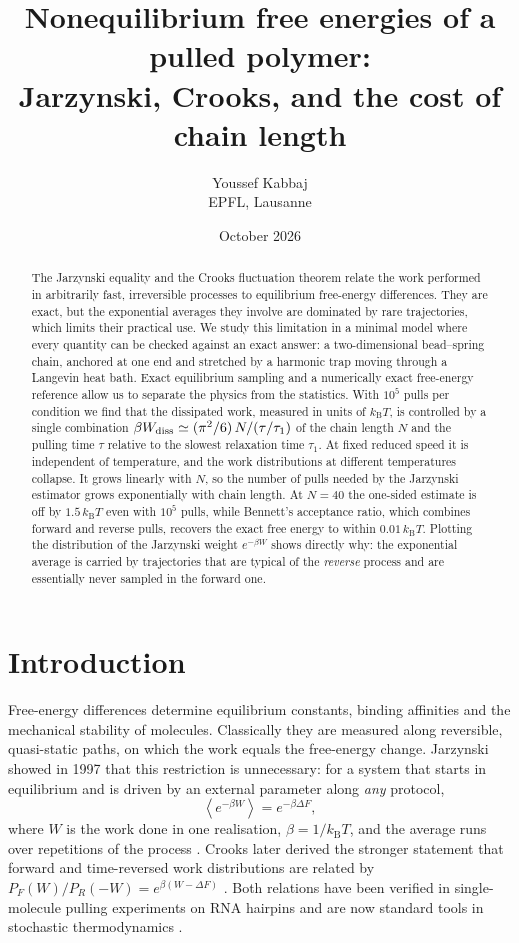 \documentclass[11pt,a4paper]{article}
\title{\textbf{Nonequilibrium free energies of a pulled polymer:\\
Jarzynski, Crooks, and the cost of chain length}}
\author{Youssef Kabbaj\\[0.2em]\small EPFL, Lausanne}
\date{October 2026}
\newcommand{\kT}{k_{\mathrm B}T}
\newcommand{\avg}[1]{\left\langle #1\right\rangle}
\newcommand{\Wd}{W_{\rm diss}}
\begin{document}
\maketitle

\begin{abstract}
The Jarzynski equality and the Crooks fluctuation theorem relate the work performed in arbitrarily
fast, irreversible processes to equilibrium free-energy differences. They are exact, but the
exponential averages they involve are dominated by rare trajectories, which limits their practical
use. We study this limitation in a minimal model where every quantity can be checked against an exact
answer: a two-dimensional bead--spring chain, anchored at one end and stretched by a harmonic trap
moving through a Langevin heat bath. Exact equilibrium sampling and a numerically exact free-energy
reference allow us to separate the physics from the statistics. With $10^5$ pulls per condition we find
that the dissipated work, measured in units of $\kT$, is controlled by a single combination
$\beta\Wd\simeq(\pi^2/6)\,N/(\tau/\tau_1)$ of the chain length $N$ and the pulling time $\tau$ relative to
the slowest relaxation time $\tau_1$. At fixed reduced speed it is independent of temperature, and the
work distributions at different temperatures collapse. It grows linearly with $N$, so the number of
pulls needed by the Jarzynski estimator grows exponentially with chain length. At $N=40$ the one-sided
estimate is off by $1.5\,\kT$ even with $10^5$ pulls, while Bennett's acceptance ratio, which combines
forward and reverse pulls, recovers the exact free energy to within $0.01\,\kT$. Plotting the
distribution of the Jarzynski weight $e^{-\beta W}$ shows directly why: the exponential average is
carried by trajectories that are typical of the \emph{reverse} process and are essentially never
sampled in the forward one.
\end{abstract}

\section{Introduction}

Free-energy differences determine equilibrium constants, binding affinities and the mechanical
stability of molecules. Classically they are measured along reversible, quasi-static paths, on which the
work equals the free-energy change. Jarzynski showed in 1997 that this restriction is unnecessary: for a
system that starts in equilibrium and is driven by an external parameter along \emph{any} protocol,
\begin{equation}
\avg{e^{-\beta W}}=e^{-\beta\Delta F},
\label{eq:JE}
\end{equation}
where $W$ is the work done in one realisation, $\beta=1/\kT$, and the average runs over repetitions of
the process \cite{J97}. Crooks later derived the stronger statement that forward and time-reversed work
distributions are related by $P_F(W)/P_R(-W)=e^{\beta(W-\Delta F)}$ \cite{C99}. Both relations have been
verified in single-molecule pulling experiments on RNA hairpins \cite{L02,C05} and are now standard tools
in stochastic thermodynamics \cite{Seifert}.
\end{document}
